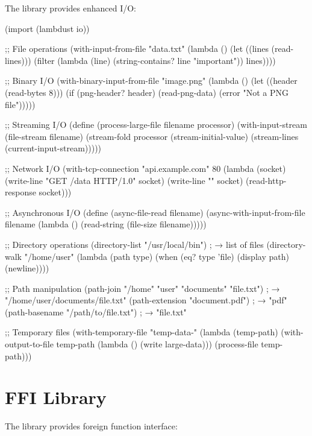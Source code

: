 The  library provides enhanced I/O:

\begin{example}[I/O Library]
\begin{lambdustcode}
(import (lambdust io))

;; File operations
(with-input-from-file "data.txt"
  (lambda ()
    (let ((lines (read-lines)))
      (filter (lambda (line) (string-contains? line "important")) lines))))

;; Binary I/O
(with-binary-input-from-file "image.png"
  (lambda ()
    (let ((header (read-bytes 8)))
      (if (png-header? header)
          (read-png-data)
          (error "Not a PNG file")))))

;; Streaming I/O
(define (process-large-file filename processor)
  (with-input-stream (file-stream filename)
    (stream-fold processor (stream-initial-value) 
                 (stream-lines (current-input-stream)))))

;; Network I/O
(with-tcp-connection "api.example.com" 80
  (lambda (socket)
    (write-line "GET /data HTTP/1.0" socket)
    (write-line "" socket)
    (read-http-response socket)))

;; Asynchronous I/O
(define (async-file-read filename)
  (async-with-input-from-file filename
    (lambda ()
      (read-string (file-size filename)))))

;; Directory operations
(directory-list "/usr/local/bin")         ; → list of files
(directory-walk "/home/user" 
  (lambda (path type) 
    (when (eq? type 'file)
      (display path) (newline))))

;; Path manipulation
(path-join "/home" "user" "documents" "file.txt")
; → "/home/user/documents/file.txt"
(path-extension "document.pdf")          ; → "pdf"
(path-basename "/path/to/file.txt")      ; → "file.txt"

;; Temporary files
(with-temporary-file "temp-data-"
  (lambda (temp-path)
    (with-output-to-file temp-path
      (lambda () (write large-data)))
    (process-file temp-path)))
\end{lambdustcode}
\end{example}

\section{FFI Library}
\label{sec:ffi-library}


The  library provides foreign function interface:

